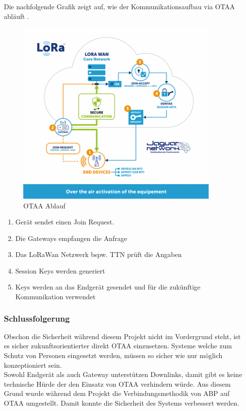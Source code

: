 \documentclass[11pt,english,german]{report}
\theoremstyle{definition}
\begin{document}
\newpage
\noindent
Die nachfolgende Grafik zeigt auf, wie der Kommunikationsaufbau via OTAA abläuft \cite{jaguar}.
\begin{figure}[H]
	\centering
	\includegraphics[width=0.9\textwidth]{img/otaa_schema.png}
	\caption[OTAA Ablauf]
	{OTAA Ablauf}
\end{figure}

\begin{enumerate}
	\item Gerät sendet einen Join Request.
	\item Die Gateways empfangen die Anfrage
	\item Das LoRaWan Netzwerk  bspw. TTN prüft die Angaben
	\item Session Keys werden generiert
	\item Keys werden an das Endgerät gesendet und für die zukünftige Kommunikation verwendet
\end{enumerate}

\newpage
\subsubsection{Schlussfolgerung}
Obschon die Sicherheit während diesem Projekt nicht im Vordergrund steht, ist es sicher zukunftsorientierter direkt OTAA einzusetzen. Systeme welche zum Schutz von Personen eingesetzt werden, müssen so sicher wie nur möglich konzeptioniert sein.\\[0.3cm]
Sowohl Endgerät als auch Gateway unterstützen Downlinks, damit gibt es keine technische Hürde der den Einsatz von OTAA verhindern würde. Aus diesem Grund wurde während dem Projekt die Verbindungsmethodik von ABP auf OTAA umgestellt. Damit konnte die Sicherheit des Systems verbessert werden.
\end{document}
